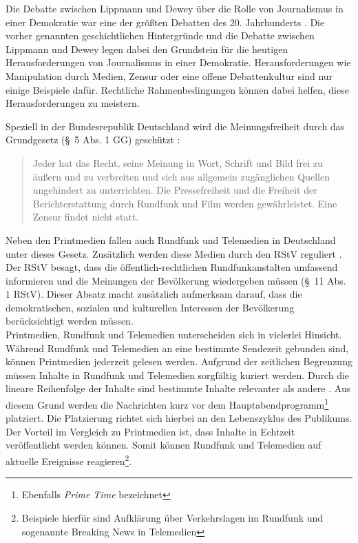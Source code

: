 Die Debatte zwischen Lippmann und Dewey über die Rolle von Journalismus in einer Demokratie war eine der größten Debatten des 20. Jahrhunderts \cite{lippmann-dewey-debate}.
Die vorher genannten geschichtlichen Hintergründe und die Debatte zwischen Lippmann und Dewey legen dabei den Grundstein für die heutigen Herausforderungen von Journalismus in einer Demokratie.
Herausforderungen wie Manipulation durch Medien, Zensur oder eine offene Debattenkultur sind nur einige Beispiele dafür.
Rechtliche Rahmenbedingungen können dabei helfen, diese Herausforderungen zu meistern.

Speziell in der Bundesrepublik Deutschland wird die Meinungsfreiheit durch das Grundgesetz (§ 5 Abs. 1 GG) geschützt \cite{gg}:
\begin{quote}
    \glqq Jeder hat das Recht, seine Meinung in Wort, Schrift und Bild frei zu äußern und zu verbreiten und sich aus allgemein zugänglichen Quellen ungehindert zu unterrichten.
    Die Pressefreiheit und die Freiheit der Berichterstattung durch Rundfunk und Film werden gewährleistet.
    Eine Zensur findet nicht statt.\grqq{}
\end{quote}
Neben den Printmedien fallen auch Rundfunk und Telemedien in Deutschland unter dieses Gesetz.
Zusätzlich werden diese Medien durch den \ac{RStV} reguliert \cite{rundfunkstaatsvertrag}.
Der \ac{RStV} besagt, dass die öffentlich-rechtlichen Rundfunkanstalten umfassend informieren und die Meinungen der Bevölkerung wiedergeben müssen (§ 11 Abs. 1 \ac{RStV}).
Dieser Absatz macht zusätzlich aufmerksam darauf, dass die demokratischen, sozialen und kulturellen Interessen der Bevölkerung berücksichtigt werden müssen. \\

Printmedien, Rundfunk und Telemedien unterscheiden sich in vielerlei Hinsicht.
Während Rundfunk und Telemedien an eine bestimmte Sendezeit gebunden sind, können Printmedien jederzeit gelesen werden.
Aufgrund der zeitlichen Begrenzung müssen Inhalte in Rundfunk und Telemedien sorgfältig kuriert werden.
Durch die lineare Reihenfolge der Inhalte sind bestimmte Inhalte relevanter als andere \cite{rundfunk}.
Aus diesem Grund werden die Nachrichten kurz vor dem Hauptabendprogramm\footnote{Ebenfalls \textit{Prime Time} bezeichnet} platziert.
Die Platzierung richtet sich hierbei an den Lebenszyklus des Publikums.
Der Vorteil im Vergleich zu Printmedien ist, dass Inhalte in Echtzeit veröffentlicht werden können.
Somit können Rundfunk und Telemedien auf aktuelle Ereignisse reagieren\footnote{Beispiele hierfür sind Aufklärung über Verkehrslagen im Rundfunk und sogenannte Breaking News in Telemedien}. \\

